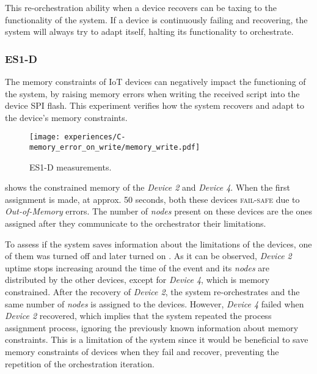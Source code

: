 This re-orchestration ability when a device recovers can be taxing to the functionality of the system. If a device is continuously failing and recovering, the system will always try to adapt itself, halting its functionality to orchestrate.


\subsubsection{ES1-D}

The memory constraints of IoT devices can negatively impact the functioning of the system, by raising memory errors when writing the received script into the device SPI flash. This experiment verifies how the system recovers and adapt to the device's memory constraints.

\begin{figure}[h]
\centering
\texttt{[image: experiences/C-memory\_error\_on\_write/memory\_write.pdf]}
\caption[ES1-D measurements]{ES1-D measurements.}\label{fig:experiment_c_graph}
\end{figure}

 shows the constrained memory of the \textit{Device 2} and \textit{Device 4}. When the first assignment is made, at approx. 50 seconds, both these devices \textsc{fail-safe} due to \textit{Out-of-Memory} errors. The number of \textit{nodes} present on these devices are the ones assigned after they communicate to the orchestrator their limitations. 

To assess if the system saves information about the limitations of the devices, one of them was turned off and later turned on . As it can be observed, \textit{Device 2} uptime stops increasing around the time of the event and its \textit{nodes} are distributed by the other devices, except for \textit{Device 4}, which is memory constrained. After the recovery of \textit{Device 2}, the system re-orchestrates and the same number of \textit{nodes} is assigned to the devices. However, \textit{Device 4} failed when \textit{Device 2} recovered, which implies that the system repeated the process assignment process, ignoring the previously known information about memory constraints. This is a limitation of the system since it would be beneficial to save memory constraints of devices when they fail and recover, preventing the repetition of the orchestration iteration.

